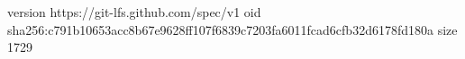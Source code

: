 version https://git-lfs.github.com/spec/v1
oid sha256:c791b10653acc8b67e9628ff107f6839c7203fa6011fcad6cfb32d6178fd180a
size 1729
